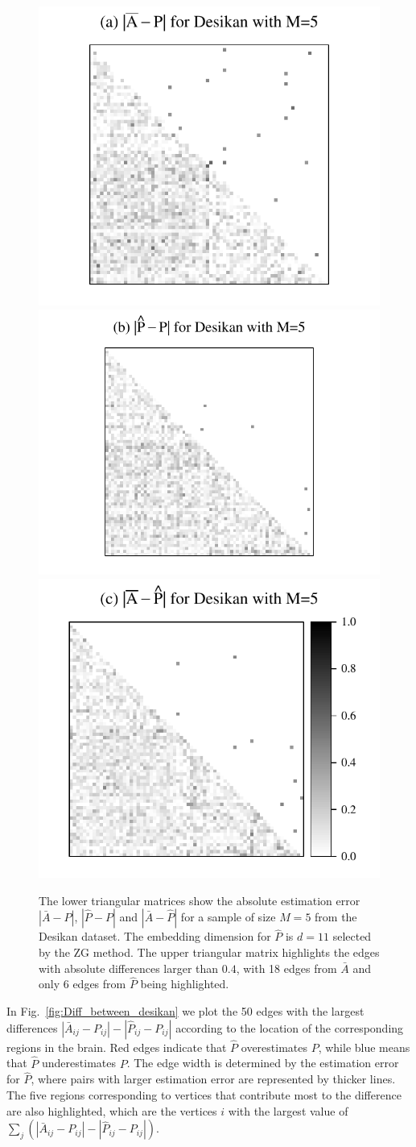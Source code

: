 \documentclass[journal,twoside,web]{ieeecolor}
\begin{document}
\begin{figure}
\begin{center}
  \includegraphics[height=.325\linewidth]{Diff2_desikan_m5.pdf}\hspace{-35pt}
  \includegraphics[height=.325\linewidth]{Diff3_desikan_m5.pdf}\hspace{-28pt}
  \includegraphics[height=.325\linewidth]{Diff1_desikan_m5.pdf}
\end{center}
\caption{
The lower triangular matrices show the absolute estimation error $|\bar{A} - P|$, $|\hat{P} - P|$ and $|\bar{A} - \hat{P}|$ for a sample of size $M=5$ from the Desikan dataset.
The embedding dimension for $\hat{P}$ is $d=11$ selected by the ZG method. 
The upper triangular matrix highlights the edges with absolute differences larger than $0.4$, with 18 edges from $\bar{A}$ and only 6 edges from $\hat{P}$ being highlighted.
}
\label{fig:Diff_desikan_m5}
\end{figure}

In Fig.~\ref{fig:Diff_between_desikan} we plot the 50 edges with the largest differences $|\bar{A}_{ij} - P_{ij}| - |\hat{P}_{ij} - P_{ij}|$ according to the location of the corresponding regions in the brain. Red edges indicate that $\hat{P}$ overestimates $P$, while blue means that $\hat{P}$ underestimates $P$. The edge width is determined by the estimation error for $\hat{P}$, where pairs with larger estimation error are represented by thicker lines.
The five regions corresponding to vertices that contribute most to the difference are also highlighted, which are the vertices $i$ with the largest value of $\sum_j (|\bar{A}_{ij} - P_{ij}| - |\hat{P}_{ij} - P_{ij}|)$.
\end{document}
